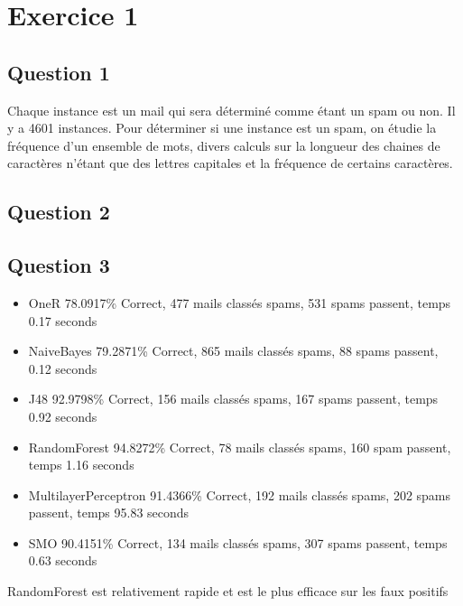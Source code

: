 \documentclass[11pt,a4paper,utf8x]{report}
\begin{document}
\chapter{Exercice 1}
\section{Question 1}
Chaque instance est un mail qui sera déterminé comme étant un spam ou non. Il y a 4601 instances. Pour déterminer si une instance est un spam, on étudie la fréquence d'un ensemble de mots, divers calculs sur la longueur des chaines de caractères n'étant que des lettres capitales et la fréquence de certains caractères.
\section{Question 2}

\section{Question 3}
\begin{itemize}
\item{OneR} 78.0917\% Correct, 477 mails classés spams, 531 spams passent, temps 0.17 seconds
\item{NaiveBayes} 79.2871\% Correct, 865 mails classés spams, 88 spams passent, 0.12 seconds
\item{J48} 92.9798\% Correct, 156 mails classés spams, 167 spams passent, temps 0.92 seconds
\item{RandomForest} 94.8272\% Correct, 78 mails classés spams, 160 spam passent, temps 1.16 seconds
\item{MultilayerPerceptron} 91.4366\% Correct, 192 mails classés spams, 202 spams passent, temps 95.83 seconds
\item{SMO} 90.4151\% Correct, 134 mails classés spams, 307 spams passent, temps 0.63 seconds
\end{itemize}
RandomForest est relativement rapide et est le plus efficace sur les faux positifs
\end{document}
